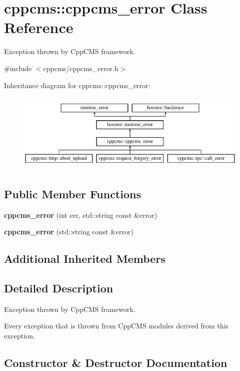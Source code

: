 \section{cppcms\+:\+:cppcms\+\_\+error Class Reference}
\label{classcppcms_1_1cppcms__error}


Exception thrown by Cpp\+C\+MS framework.  




{\ttfamily \#include $<$cppcms/cppcms\+\_\+error.\+h$>$}

Inheritance diagram for cppcms\+:\+:cppcms\+\_\+error\+:\begin{figure}[H]
\begin{center}
\leavevmode
\includegraphics[height=3.829060cm]{classcppcms_1_1cppcms__error}
\end{center}
\end{figure}
\subsection*{Public Member Functions}
\begin{DoxyCompactItemize}
\item 
{\bf cppcms\+\_\+error} (int err, std\+::string const \&error)
\item 
{\bf cppcms\+\_\+error} (std\+::string const \&error)
\end{DoxyCompactItemize}
\subsection*{Additional Inherited Members}


\subsection{Detailed Description}
Exception thrown by Cpp\+C\+MS framework. 

Every exception that is thrown from Cpp\+C\+MS modules derived from this exception. 

\subsection{Constructor \& Destructor Documentation}
